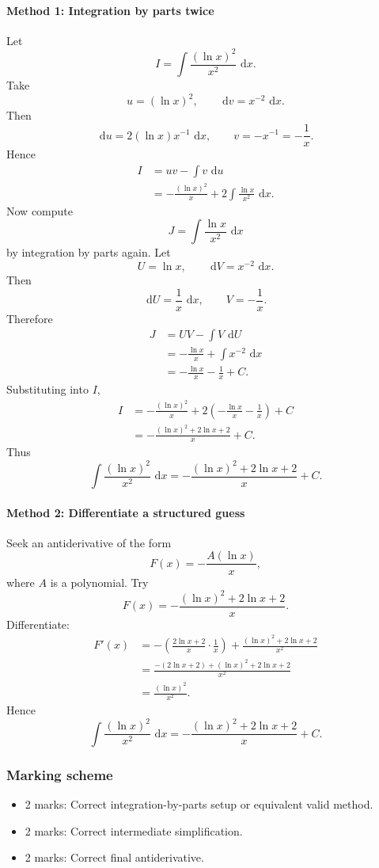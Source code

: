 \documentclass[12pt]{article}
\newcommand{\dd}{\,\mathrm{d}}
\begin{document}
\paragraph{Method 1: Integration by parts twice}
Let
\[
I=\int \frac{(\ln x)^2}{x^2}\,\dd x.
\]
Take
\[
u=(\ln x)^2,\qquad \dd v=x^{-2}\,\dd x.
\]
Then
\[
\dd u=2(\ln x)x^{-1}\,\dd x,
\qquad
v=-x^{-1}=-\frac{1}{x}.
\]
Hence
\begin{align*}
I
&=uv-\int v\,\dd u \\
&=-\frac{(\ln x)^2}{x}+2\int \frac{\ln x}{x^2}\,\dd x.
\end{align*}
Now compute
\[
J=\int \frac{\ln x}{x^2}\,\dd x
\]
by integration by parts again. Let
\[
U=\ln x,\qquad \dd V=x^{-2}\,\dd x.
\]
Then
\[
\dd U=\frac{1}{x}\,\dd x,
\qquad
V=-\frac{1}{x}.
\]
Therefore
\begin{align*}
J
&=UV-\int V\,\dd U \\
&=-\frac{\ln x}{x}+\int x^{-2}\,\dd x \\
&=-\frac{\ln x}{x}-\frac{1}{x}+C.
\end{align*}
Substituting into \(I\),
\begin{align*}
I
&=-\frac{(\ln x)^2}{x}+2\left(-\frac{\ln x}{x}-\frac{1}{x}\right)+C \\
&=-\frac{(\ln x)^2+2\ln x+2}{x}+C.
\end{align*}
Thus
\[
\boxed{\int \frac{(\ln x)^2}{x^2}\,\dd x
=-\frac{(\ln x)^2+2\ln x+2}{x}+C.}
\]

\newpage
\paragraph{Method 2: Differentiate a structured guess}
Seek an antiderivative of the form
\[
F(x)=-\frac{A(\ln x)}{x},
\]
where \(A\) is a polynomial. Try
\[
F(x)=-\frac{(\ln x)^2+2\ln x+2}{x}.
\]
Differentiate:
\begin{align*}
F'(x)
&=-\left(\frac{2\ln x+2}{x}\cdot \frac{1}{x}\right)
+\frac{(\ln x)^2+2\ln x+2}{x^2} \\
&=\frac{-(2\ln x+2)+(\ln x)^2+2\ln x+2}{x^2} \\
&=\frac{(\ln x)^2}{x^2}.
\end{align*}
Hence
\[
\boxed{\int \frac{(\ln x)^2}{x^2}\,\dd x
=-\frac{(\ln x)^2+2\ln x+2}{x}+C.}
\]

\subsubsection{Marking scheme}
\begin{itemize}
\item 2 marks: Correct integration-by-parts setup or equivalent valid method.
\item 2 marks: Correct intermediate simplification.
\item 2 marks: Correct final antiderivative.
\end{itemize}
\end{document}
